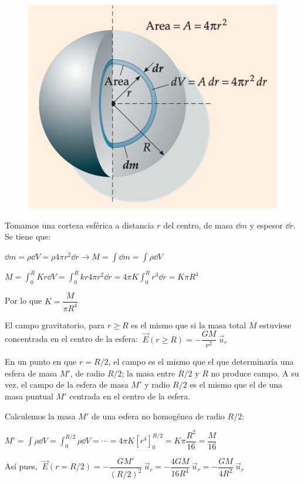 \begin{figure}[H]
	\centering
	\includegraphics[width=.75\textwidth]{imagenes/imagenes15/T15IM12.png}
\end{figure}

Tomamos una corteza esférica a distancia $r$ del centro, de masa $\dd m$ y espesor $\dd r$. Se tiene que:

$\displaystyle \dd m=\rho \dd V= \rho 4\pi r^2 \dd r \to M=\int \dd m =\int \rho \dd V$

$\displaystyle M=\int_0^R Kr \dd V = \int_0^R k r 4\pi r^2 \dd r= 4\pi K \int_0^R r^3 \dd r= K\pi R^4$

Por lo que $K=\dfrac{M}{\pi R^4}$

El campo gravitatorio, para $r\geq R$ es el mismo que si la masa total $M$ estuviese concentrada en el centro de la esfera:
$\ \vec E(r\geq R)=-\dfrac{GM}{r^2}\ \vec u_r$

En un punto en que $r=R/2$, el campo es el mismo que el que determinaría una esfera de masa $M'$, de radio $R/2$; la masa entre $R/2$ y $R$ no produce campo. A su vez, el campo de la esfera de masa $M'$ y radio $R/2$ es el mismo que el de una masa puntual $M'$ centrada en el centro de la esfera.

Calculemos la masa $M'$ de una esfera no homogénea de radio $R/2$:

$M'=\displaystyle \int \rho \dd V=\int_0^{R/2}\rho \dd V = \cdots = 4\pi K  \left[ r^4 \right]_0^{R/2}= K\pi \dfrac {R^2}{16} =\dfrac{M}{16}$

Así pues, $\ \vec E(r=R/2)= -\dfrac{GM'}{(R/2)^2}\ \vec u_r=-\dfrac{4GM}{16R^4} \ \vec u_r =-\dfrac{GM}{4R^2}\ \vec u_r$




